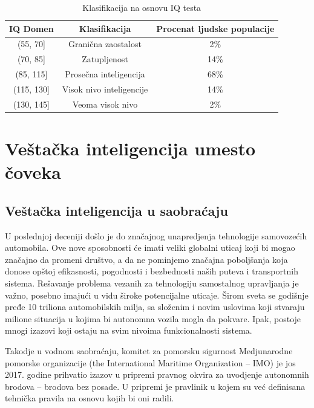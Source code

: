 \documentclass[a4paper]{article}
\begin{document}
\begin{table}[h!]
\begin{center}
\caption{Klasifikacija na osnovu IQ testa}
\label{tab:tabelaIQ}
\begin{tabular}{|c|c|c|} \hline
IQ Domen & Klasifikacija & Procenat ljudske populacije\\ \hline
(55, 70]& Granična zaostalost & 2\%\\ \hline
(70, 85] & Zatupljenost & 14\%\\ \hline
(85, 115] & Prosečna inteligencija & 68\%\\ \hline
(115, 130] & Visok nivo inteligencije & 14\%\\ \hline
(130, 145] & Veoma visok nivo & 2\% \\ \hline
\end{tabular}
\end{center}
\end{table}


\section{Veštačka inteligencija umesto čoveka}

\subsection{Veštačka inteligencija u saobraćaju}

U poslednjoj deceniji došlo je do značajnog unapredjenja tehnologije samovozećih automobila. Ove nove sposobnosti će imati veliki globalni uticaj koji bi mogao značajno da promeni društvo, a da ne pominjemo značajna poboljšanja koja donose opštoj efikasnosti, pogodnosti i bezbednosti naših puteva i transportnih sistema. Rešavanje problema vezanih za tehnologiju samostalnog upravljanja je važno, posebno imajući u vidu široke potencijalne uticaje. Širom sveta se godišnje pređe 10 triliona automobilskih milja, sa složenim i novim uslovima koji stvaraju milione situacija u kojima bi autonomna vozila mogla da pokvare. Ipak, postoje mnogi izazovi koji ostaju na svim nivoima funkcionalnosti sistema.

Takodje u vodnom saobraćaju, komitet za pomorsku sigurnost Medjunarodne pomorske organizacije (the International Maritime Organization – IMO) je jos 2017. godine prihvatio izazov u pripremi pravnog okvira za uvodjenje autonomnih brodova – brodova bez posade. U pripremi je pravlinik u kojem su već definisana tehnička pravila na osnovu kojih bi oni radili. 
\end{document}
